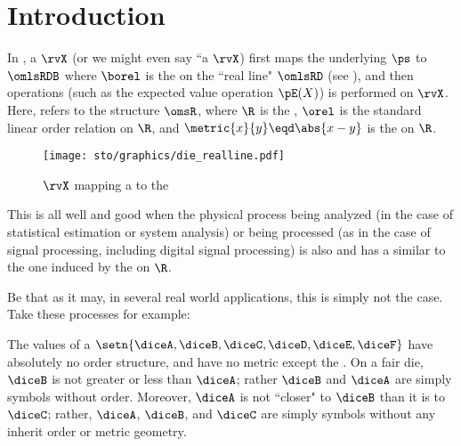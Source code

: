 \section{Introduction}
\begin{minipage}{\tw-10mm}
In , a  $\rvX$
(or we might even say ``a  $\rvX$)
first maps the underlying  $\ps$ to 
$\omlsRDB$ where $\borel$ is the 
on the ``real line" $\omlsRD$ (see ),
and then operations (such as the expected value operation $\pE(X)$) is performed on $\rvX$. 
Here,  refers to the structure $\omsR$, where $\R$ is the ,
$\orel$ is the standard linear order relation on $\R$, and $\metric{x}{y}\eqd\abs{x-y}$ is the 
 on $\R$.
\end{minipage}\hfill%
\begin{figure}[h]%
  \centering%
  \texttt{[image: sto/graphics/die\_realline.pdf]}%
  \caption{ $\rvX$ mapping a  to the  \label{fig:die_realline}}
\end{figure}

This is all well and good when the physical process being analyzed (in the case of statistical estimation 
or system analysis) or being processed (as in the case of signal processing, including digital signal processing)
is also  and has a  similar to the one induced 
by the  on $\R$.

Be that as it may, in several real world applications, this is simply not the case. 
Take these processes for example:

\begin{minipage}{\tw-50mm}\imarks
  The values of a  $\setn{\diceA,\diceB,\diceC,\diceD,\diceE,\diceF}$
  have absolutely no order structure, 
  and have no metric except the . 
  On a fair die, $\diceB$ is not greater or less than $\diceA$; rather $\diceB$ and $\diceA$ are simply symbols without order.
  Moreover, $\diceA$ is not ``closer" to $\diceB$ than it is to $\diceC$;
  rather, $\diceA$, $\diceB$, and $\diceC$ are simply symbols without any inherit order or metric geometry.
\end{minipage}\hfill{}


